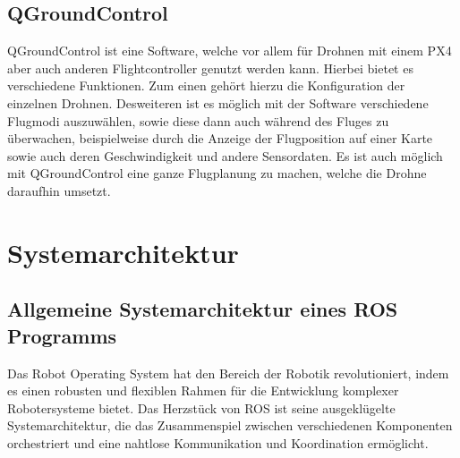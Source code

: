 \subsection{QGroundControl}  \label{qGroundControl:subsection}
QGroundControl ist eine Software, welche vor allem für Drohnen mit einem PX4 aber auch anderen Flightcontroller genutzt werden kann. Hierbei bietet es verschiedene Funktionen. Zum einen gehört hierzu die Konfiguration der einzelnen  Drohnen. Desweiteren ist es möglich mit der Software verschiedene Flugmodi auszuwählen, sowie diese dann auch während des Fluges zu überwachen, beispielweise durch die Anzeige der Flugposition auf einer Karte sowie auch deren Geschwindigkeit und andere Sensordaten.
Es ist auch möglich mit QGroundControl eine ganze Flugplanung zu machen, welche die Drohne daraufhin umsetzt. \cite[vgl.][]{qGroundControl}


\section{Systemarchitektur}\label{systemarchitektur:section}

\subsection{Allgemeine Systemarchitektur eines ROS Programms} \label{systemarchitektur_ros_programm:subsection}
Das Robot Operating System hat den Bereich der Robotik revolutioniert, indem es einen robusten und flexiblen Rahmen für die Entwicklung komplexer Robotersysteme bietet. Das Herzstück von \ac{ROS} ist seine ausgeklügelte Systemarchitektur, die das Zusammenspiel zwischen verschiedenen Komponenten orchestriert und eine nahtlose Kommunikation und Koordination ermöglicht.

